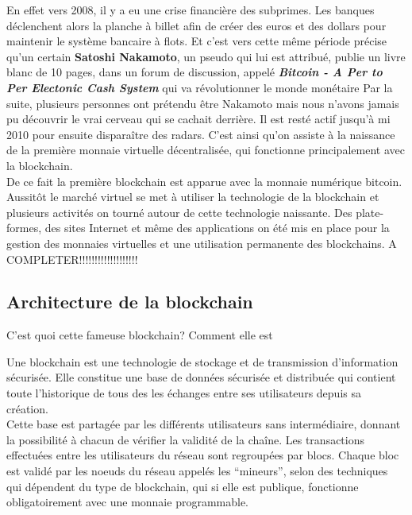 \documentclass[12pt]{report}
\begin{document}
\hspace{1cm} En effet vers 2008, il y a eu une crise financière des subprimes. Les banques déclenchent alors la planche à billet afin de créer des euros et des dollars pour maintenir le système bancaire à flots. Et c'est vers cette même période précise qu'un certain \textbf{Satoshi Nakamoto}, un pseudo qui lui est attribué, publie un livre blanc de 10 pages, dans un forum de discussion, appelé \textbf{\textit{Bitcoin - A Per to Per Electonic Cash System }} qui va révolutionner le monde monétaire Par la suite, plusieurs personnes ont prétendu être Nakamoto mais nous n'avons jamais pu découvrir le vrai cerveau qui se cachait derrière. Il est resté actif jusqu'à mi 2010 pour ensuite disparaître des radars. C'est ainsi qu'on assiste à la naissance  de la première monnaie virtuelle décentralisée, qui fonctionne principalement avec la blockchain. \\ 

\hspace{1cm} De ce fait la première blockchain est apparue avec la monnaie numérique bitcoin. Aussitôt le marché virtuel se met à utiliser la technologie de la blockchain et plusieurs activités on tourné autour de cette technologie naissante. Des plate-formes, des sites Internet et même des applications on été mis en place pour la gestion des monnaies virtuelles et une utilisation permanente des blockchains. A COMPLETER!!!!!!!!!!!!!!!!!!!

	\subsection{Architecture de la blockchain}
\hspace{1cm} C'est quoi cette fameuse blockchain? Comment elle est 

\hspace{1cm} Une blockchain est une technologie de stockage et de transmission d’information sécurisée. Elle constitue une base de données sécurisée et distribuée qui contient toute l’historique de tous des les échanges entre ses utilisateurs depuis sa création. \\

Cette base est partagée par les différents utilisateurs sans intermédiaire, donnant la possibilité à chacun de vérifier la validité de la chaîne. Les transactions effectuées entre les utilisateurs du réseau sont regroupées par blocs. Chaque bloc est validé par les noeuds du réseau appelés les “mineurs”, selon des techniques qui dépendent du type de blockchain, qui si elle est publique, fonctionne obligatoirement avec une monnaie programmable. \\
\end{document}
